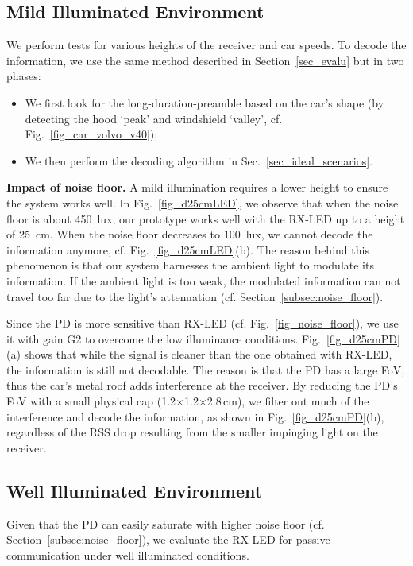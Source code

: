 \documentclass[10pt]{sig-alternate-05-2015}
\begin{document}
\vspace{-1mm}
\subsection{Mild Illuminated Environment}
We perform tests for various heights of the receiver and car speeds. To decode the information, we use the same method described in Section~\ref{sec_evalu} but in two phases:
\begin{itemize}
	\item We first look for the long-duration-preamble based on the car's shape (by detecting the hood `peak' and windshield `valley', cf. Fig.~\ref{fig_car_volvo_v40});
	\item We then perform the decoding algorithm in Sec.~\ref{sec_ideal_scenarios}.
\end{itemize}

\textbf{Impact of noise floor.}
A mild illumination requires a lower height to ensure the system works well. In Fig.~\ref{fig_d25cmLED}, we observe that when the noise floor is about 450~lux, our prototype works well with the RX-LED up to a height of 25~cm. When the noise floor decreases to 100~lux, we cannot decode the information anymore, cf. Fig.~\ref{fig_d25cmLED}(b). The reason behind this phenomenon is that our system harnesses the ambient light to modulate its information. If the ambient light is too weak, the modulated information can not travel too far due to the light's attenuation (cf. Section~\ref{subsec:noise_floor}).

Since the PD is more sensitive than RX-LED (cf. Fig.~\ref{fig_noise_floor}), we use it with gain G2 to overcome the low illuminance conditions. Fig.~\ref{fig_d25cmPD}(a) shows that while the signal is cleaner than the one obtained with RX-LED, the information is still not decodable. The reason is that the PD has a large FoV, thus the car's metal roof adds interference at the receiver. By reducing the PD's FoV with a small physical cap (1.2$\times$1.2$\times$2.8\,cm), we filter out much of the interference and decode the information, as shown in Fig.~\ref{fig_d25cmPD}(b), regardless of the RSS drop resulting from the smaller impinging light on the receiver.

\vspace{-1mm}
\subsection{Well Illuminated Environment}

Given that the PD can easily saturate with higher noise floor (cf. Section~\ref{subsec:noise_floor}), we evaluate the RX-LED for passive communication under well illuminated conditions.
\end{document}
